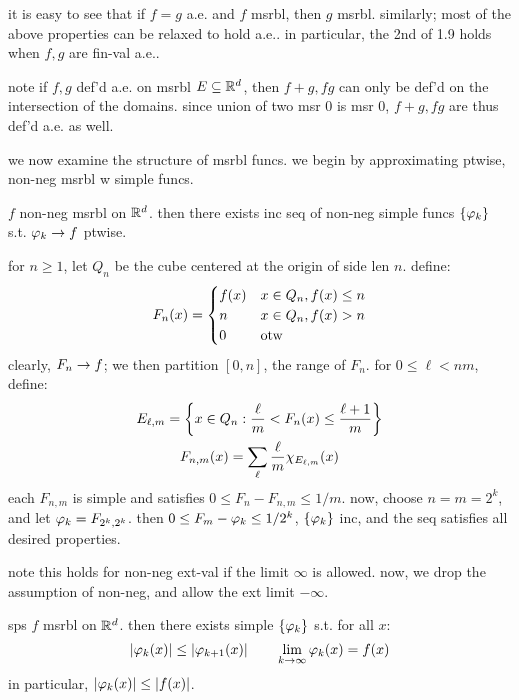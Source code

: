 it is easy to see that if $f=g$ a.e. and $f$ msrbl, then $g$ msrbl.
similarly; most of the above properties can be relaxed to hold a.e..
in particular, the 2nd of 1.9 holds when $f,g$ are fin-val a.e..

note if $f,g$ def'd a.e. on msrbl $E\subseteq\mathbb{R}^{d}$, then $f+g,fg$ can only
be def'd on the intersection of the domains.
since union of two msr 0 is msr 0, $f+g,fg$ are thus def'd a.e. as well.

we now examine the structure of msrbl funcs.
we begin by approximating ptwise, non-neg msrbl w simple funcs.

\newpage
\begin{prop}
    $f$ non-neg msrbl on $\mathbb{R}^{d}$.
    then there exists inc seq of non-neg simple funcs $\left\{{\varphi_{k}}\right\}$ s.t.
    $\varphi_{k}\rightarrow f$ ptwise.
\end{prop}

\begin{pf}[source=Primary Source Material]
    for $n\geq1$, let $Q_{n}$ be the cube centered at the origin of side len $n$.
    define:
    \begin{equation*}
        F_{n}(x) =
        \begin{cases}
            f(x) & x\in Q_{n},f(x)\leq n\\
            n & x\in Q_{n},f(x)>n \\
            0 & \textrm{otw}
        \end{cases}
    \end{equation*}
    clearly, $F_{n}\rightarrow f$;
    we then partition $[0,n]$, the range of $F_{n}$. for $0\leq\ell<nm$, define:
    \begin{gather*}
        E_{\ell,m}=\left\{{x\in Q_{n}:\frac{\ell}{m}<F_{n}(x)\leq\frac{\ell+1}{m}}\right\}
        \\
        F_{n,m}(x)=\sum_{\ell}\frac{\ell}{m}\chi_{E_{\ell,m}}(x)
    \end{gather*}
    each $F_{n,m}$ is simple and satisfies $0\leq F_{n}-F_{n,m}\leq1/m$.
    now, choose $n=m=2^{k}$, and let $\varphi_{k}=F_{2^{k},2^{k}}$.
    then $0\leq F_{m}-\varphi_{k}\leq1/2^{k}$, $\left\{{\varphi_{k}}\right\}$ inc, and the seq
    satisfies all desired properties.
\end{pf}
note this holds for non-neg ext-val if the limit $\infty$ is allowed.
now, we drop the assumption of non-neg, and allow the ext limit $-\infty$.

\newpage
\begin{prop}
    sps $f$ msrbl on $\mathbb{R}^{d}$.
    then there exists simple $\left\{{\varphi_{k}}\right\}$ s.t. for all $x$:
    \begin{equation*}
        \abs{\varphi_{k}(x)}\leq\abs{\varphi_{k+1}(x)} \qquad
        \lim_{k\rightarrow\infty}\varphi_{k}(x)=f(x)
    \end{equation*}
    in particular, $\abs{\varphi_{k}(x)}\leq\abs{f(x)}$.
\end{prop}




